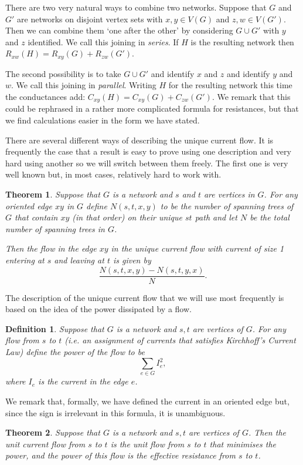 \documentclass[11pt]{article}
\newtheorem{theorem}{Theorem}
\newtheorem*{defn}{Definition}
\theoremstyle{remark}
\begin{document}
There are two very natural ways to combine two networks. Suppose that $G$
and $G'$ are networks on disjoint vertex sets with $x,y\in V(G)$ and
$z,w\in V(G')$. Then we can combine them `one after the other' by
considering $G\cup G'$ with $y$ and $z$ identified. We call this
joining in \emph{series}. If $H$ is the resulting network then
$R_{xw}(H)=R_{xy}(G)+R_{zw}(G')$.

The second possibility is to take $G\cup G'$ and identify $x$ and $z$
and identify $y$ and $w$. We call this joining in
\emph{parallel}. Writing $H$ for the resulting network this time the
conductances add: $C_{xy}(H)=C_{xy}(G)+C_{zw}(G')$. We remark that
this could be rephrased in a rather more complicated formula for
resistances, but that we find calculations easier in the form we have
stated.


There are several different ways of describing the unique current
flow. It is frequently the case that a result is easy to prove using
one description and very hard using another so we will switch between
them freely. The first one is very well known but, in most cases,
relatively hard to work with.

\begin{theorem}
  Suppose that $G$ is a network and $s$ and $t$ are vertices in
  $G$. For any oriented edge $xy$ in $G$ define $N(s,t,x,y)$ to be the
  number of spanning trees of $G$ that contain $xy$ (in that order) on
  their unique $st$ path and let $N$ be the total number of spanning
  trees in $G$.

  Then the flow in the edge $xy$ in the unique current flow with
  current of size 1 entering at $s$ and leaving at $t$ is given by
  \[\frac{N(s,t,x,y)-N(s,t,y,x)}{N}.
\]
\end{theorem}

The description of the unique current flow that we will use most
frequently is based on the idea of the power dissipated by a flow.
\begin{defn}
  Suppose that $G$ is a network and $s,t$ are vertices of $G$. For
  any flow from $s$ to $t$ (i.e. an assignment of currents that
  satisfies Kirchhoff's Current Law) define the \emph{power of the flow} to be
  \[\sum_{e\in G}I_e^2,
  \]
  where $I_e$ is the current in the edge $e$. 
\end{defn}
We remark that, formally, we have defined the current in an oriented
edge but, since the sign is irrelevant in this formula, it is
unambiguous.
\begin{theorem}\label{t:energy}
  Suppose that $G$ is a network and $s,t$ are vertices of
  $G$. Then the unit current flow from $s$ to $t$ is the unit flow
  from $s$ to $t$ that minimises the power, and the power of this flow
  is the effective resistance from $s$ to $t$.
\end{theorem}
\end{document}
